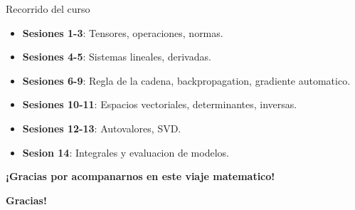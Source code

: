 \documentclass[aspectratio=169, 10pt, xcolor=table]{beamer}
\begin{document}
\begin{frame}{Recorrido del curso}
    \begin{itemize}
        \item \textbf{Sesiones 1-3}: Tensores, operaciones, normas.
        \item \textbf{Sesiones 4-5}: Sistemas lineales, derivadas.
        \item \textbf{Sesiones 6-9}: Regla de la cadena, backpropagation, gradiente automatico.
        \item \textbf{Sesiones 10-11}: Espacios vectoriales, determinantes, inversas.
        \item \textbf{Sesiones 12-13}: Autovalores, SVD.
        \item \textbf{Sesion 14}: Integrales y evaluacion de modelos.
    \end{itemize}
    \vspace{0.3cm}
    \centering
    \textbf{¡Gracias por acompanarnos en este viaje matematico!}
\end{frame}

\begin{frame}
    \centering
    \Huge \textbf{Gracias!}

\end{frame}
\end{document}
